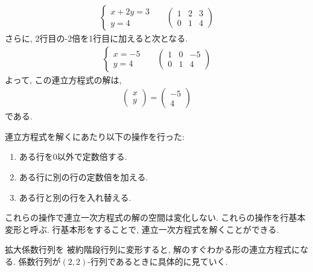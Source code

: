 \begin{align*}
  \begin{cases}
    x+2y=3\\
     y=4
  \end{cases}&&
  \begin{pmatrix}
    1&2&3\\    
    0&1&4
  \end{pmatrix}
\end{align*}
さらに,
2行目の-2倍を1行目に加えると次となる.
\begin{align*}
  \begin{cases}
    x=-5\\
     y=4
  \end{cases}&&
  \begin{pmatrix}
    1&0&-5\\    
    0&1&4
  \end{pmatrix}
\end{align*}
よって,
この連立方程式の解は,
\begin{align*}
  \begin{pmatrix}
    x\\y
  \end{pmatrix}  
  =
  \begin{pmatrix}
    -5\\4
  \end{pmatrix}  
\end{align*}
である.

連立方程式を解くにあたり以下の操作を行った:
\begin{enumerate}
  \item ある行を$0$以外で定数倍する.
  \item ある行に別の行の定数倍を加える.
  \item ある行と別の行を入れ替える.
\end{enumerate}
これらの操作で連立一次方程式の解の空間は変化しない.
これらの操作を行基本変形と呼ぶ.
行基本形をすることで, 連立一次方程式を解くことができる.



拡大係数行列を
被約階段行列に変形すると,
解のすぐわかる形の連立方程式になる.
係数行列が$(2,2)$-行列であるときに具体的に見ていく.

